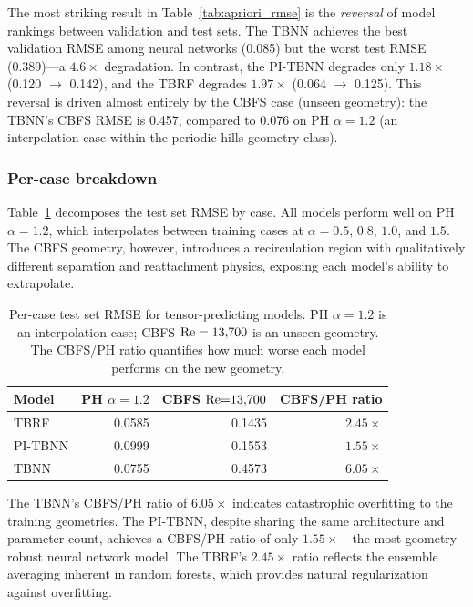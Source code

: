 The most striking result in Table~\ref{tab:apriori_rmse} is the \emph{reversal} of model rankings between validation and test sets.
The TBNN achieves the best validation RMSE among neural networks (0.085) but the worst test RMSE (0.389)---a $4.6\times$ degradation.
In contrast, the PI-TBNN degrades only $1.18\times$ (0.120 $\to$ 0.142), and the TBRF degrades $1.97\times$ (0.064 $\to$ 0.125).
This reversal is driven almost entirely by the CBFS case (unseen geometry): the TBNN's CBFS RMSE is 0.457, compared to 0.076 on PH $\alpha=1.2$ (an interpolation case within the periodic hills geometry class).

\subsubsection{Per-case breakdown}

Table~\ref{tab:apriori_percase} decomposes the test set RMSE by case.
All models perform well on PH $\alpha=1.2$, which interpolates between training cases at $\alpha=0.5$, $0.8$, $1.0$, and $1.5$.
The CBFS geometry, however, introduces a recirculation region with qualitatively different separation and reattachment physics, exposing each model's ability to extrapolate.

\begin{table}[htbp]
\centering
\caption{Per-case test set RMSE for tensor-predicting models. PH $\alpha=1.2$ is an interpolation case; CBFS $\mathrm{Re}=13{,}700$ is an unseen geometry. The CBFS/PH ratio quantifies how much worse each model performs on the new geometry.}
\label{tab:apriori_percase}
\begin{tabular}{lrrr}
\toprule
Model & PH $\alpha{=}1.2$ & CBFS $\mathrm{Re}{=}13{,}700$ & CBFS/PH ratio \\
\midrule
TBRF     & 0.0585 & 0.1435 & $2.45\times$ \\
PI-TBNN  & 0.0999 & 0.1553 & $1.55\times$ \\
TBNN     & 0.0755 & 0.4573 & $6.05\times$ \\
\bottomrule
\end{tabular}
\end{table}

The TBNN's CBFS/PH ratio of $6.05\times$ indicates catastrophic overfitting to the training geometries.
The PI-TBNN, despite sharing the same architecture and parameter count, achieves a CBFS/PH ratio of only $1.55\times$---the most geometry-robust neural network model.
The TBRF's $2.45\times$ ratio reflects the ensemble averaging inherent in random forests, which provides natural regularization against overfitting.

